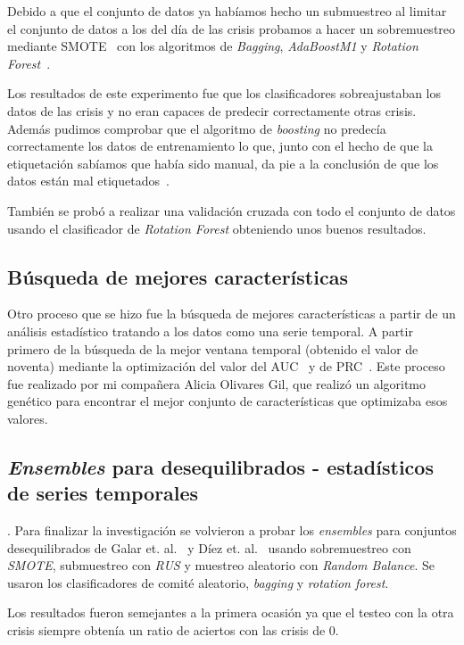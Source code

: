 Debido a que el conjunto de datos ya habíamos hecho un submuestreo al limitar el conjunto de datos a los del día de las crisis probamos a hacer un sobremuestreo mediante SMOTE~\cite{galar2012review} con los algoritmos de \textit{Bagging}, \textit{AdaBoostM1} y \textit{Rotation Forest}~\cite{rodriguez2006rotation}.

Los resultados de este experimento fue que los clasificadores sobreajustaban los datos de las crisis y no eran capaces de predecir correctamente otras crisis. Además pudimos comprobar que el algoritmo de \textit{boosting} no predecía correctamente los datos de entrenamiento lo que, junto con el hecho de que la etiquetación sabíamos que había sido manual, da pie a la conclusión de que los datos están mal etiquetados~\cite{ubu:mineria3}.

También se probó a realizar una validación cruzada con todo el conjunto de datos usando el clasificador de \textit{Rotation Forest} obteniendo unos buenos resultados.

\subsection{Búsqueda de mejores características}
Otro proceso que se hizo fue la búsqueda de mejores características a partir de un análisis estadístico tratando a los datos como una serie temporal. A partir primero de la búsqueda de la mejor ventana temporal (obtenido el valor de noventa) mediante la optimización del valor del AUC~\cite{galar2012review} y de PRC~\cite{Davis2006RPR}. Este proceso fue realizado por mi compañera Alicia Olivares Gil, que realizó un algoritmo genético para encontrar el mejor conjunto de características que optimizaba esos valores.

\subsection{\textit{Ensembles} para desequilibrados - estadísticos de series temporales}.
Para finalizar la investigación se volvieron a probar los \textit{ensembles} para conjuntos desequilibrados de Galar et. al.~\cite{galar2012review} y Díez et. al.~\cite{diez2015random, diez2015diversity} usando sobremuestreo con \textit{SMOTE}, submuestreo con \textit{RUS} y muestreo aleatorio con \textit{Random Balance}. Se usaron los clasificadores de comité aleatorio, \textit{bagging} y \textit{rotation forest}.

Los resultados fueron semejantes a la primera ocasión ya que el testeo con la otra crisis siempre obtenía un ratio de aciertos con las crisis de 0.

